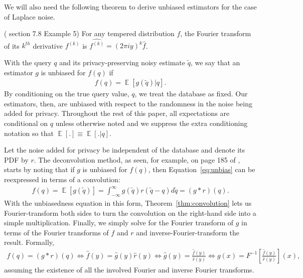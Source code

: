\documentclass[11pt]{article}
\newcommand{\E}{\operatorname{\mathbb{E}}}
\begin{document}
We will also need the following theorem to derive unbiased estimators for the case of Laplace noise.


\begin{theorem}
    \label{thm:tmpDistFourierDeriv}
    (\cite{vanDijk+2013} section 7.8 Example 5)
    For any tempered distribution $f$, the Fourier transform of its $k^{th}$ derivative $f^{(k)}$ is $\widehat{f^{(k)}} = (2\pi i y)^k \hat{f}$.
\end{theorem}



With the query $q$ and its privacy-preserving noisy estimate $\tilde{q}$, we say that an estimator $g$
is unbiased for $f(q)$ if \begin{align} \label{eq:unbias}
f(q) = \E[g(\tilde{q}) | q].
\end{align}
By conditioning on the true query value, $q$, we treat the database as fixed. Our estimators, then, are unbiased with respect to the randomness in the noise being added for privacy. Throughout the rest of this paper, all expectations are conditional on $q$ unless otherwise noted and we suppress the extra conditioning notation so that $\E[.] \equiv \E[.|q]$.

Let the noise added for privacy be independent of the database and denote its PDF by $r$. The deconvolution method, as seen, for example, on page 185 of \cite{VoinovNikulin1993}, starts by noting that if $g$ is unbiased for $f(q)$, then Equation~\ref{eq:unbias} can be reexpressed in terms of a convolution:
\begin{align} \label{eq:unbiasConv}
    f(q) = \E[g(\tilde{q})] = \int_{-\infty}^\infty g(\tilde{q}) r(\tilde{q} - q) d\tilde{q} = (g*r)(q).
\end{align}
With the unbiasedness equation in this form, Theorem~\ref{thm:convolution} lets us Fourier-transform both sides to turn the convolution on the right-hand side into a simple multiplication. Finally, we simply solve for the Fourier transform of $g$ in terms of the Fourier transforms of $f$ and $r$ and inverse-Fourier-transform the result. Formally,
\begin{align}
    f(q) = (g*r)(q) \iff \hat{f}(y) = \hat{g}(y) \hat{r}(y) \iff \hat{g}(y) = \frac{\hat{f}(y)}{\hat{r}(y)} \iff g(x) = F^{-1}\left[\frac{\hat{f}(y)}{\hat{r}(y)}\right](x),
\end{align}
assuming the existence of all the involved Fourier and inverse Fourier transforms.
\end{document}
